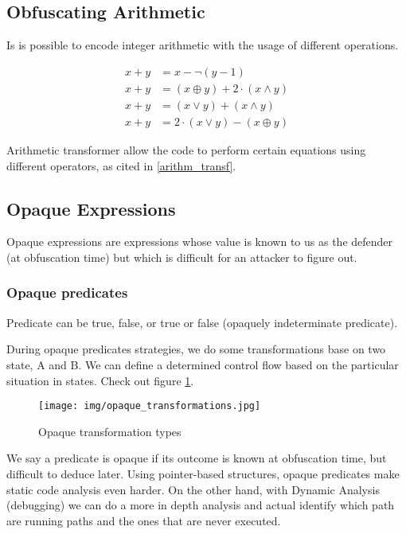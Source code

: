 \subsection{Obfuscating Arithmetic}

Is is possible to encode integer arithmetic with the usage of different operations. 

\begin{center}\label{arithm_transf}
\begin{align*}
        x+y &= x - \neg (y - 1) \\
        x+y &= (x \oplus y) + 2 \cdot (x \land y) \\
        x+y &= (x \lor y) + (x \land y) \\
        x+y &= 2 \cdot (x \lor y) - (x \oplus y)
\end{align*}
\end{center}
\par
Arithmetic transformer allow the code to perform certain equations using different operators, as cited in \ref{arithm_transf}.

\subsection{Opaque Expressions}

Opaque expressions are expressions whose value is known to us as the defender (at obfuscation time) but which is difficult for an attacker to figure out.

\subsubsection{Opaque predicates}

Predicate can be true, false, or true or false (opaquely indeterminate predicate). 

During opaque predicates strategies, we do some transformations base on two state, A and B. 
We can define a determined control flow based on the particular situation in states. 
Check out figure \ref{fig:opaque_transformations}.

\begin{figure}
    \centering
    \texttt{[image: img/opaque\_transformations.jpg]}
    \caption{Opaque transformation types}
    \label{fig:opaque_transformations}
\end{figure}

We say a predicate is opaque if its outcome is known at obfuscation time, but difficult to deduce later. 
Using pointer-based structures, opaque predicates make static code analysis even harder. On the other hand, with Dynamic Analysis (debugging) we can do a more in depth analysis and actual identify which path are running paths and the ones that are never executed. 

